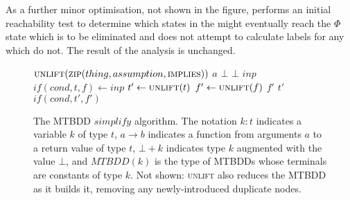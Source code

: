 As a further minor optimisation, not shown in the figure,
{\implementation} performs an initial reachability test to determine
which states in the {\StateMachine} might eventually reach the $\Phi$
state which is to be eliminated and does not attempt to calculate
labels for any which do not.  The result of the analysis is unchanged.

\begin{figure}
\begin{algorithmic}
  \State \Return $\textsc{unlift}(\textsc{zip}(thing, assumption, \textsc{implies}))$
\EndFunction
{}
    \State \Return $a$
  \Else
    \State \Return $\bot$
  \EndIf
\EndFunction
{}
    \State \Return $\bot$
    \State \Return $inp$
  \Else
    \State $if(cond, t, f) \gets inp$
    \State $t' \gets \textsc{unlift}(t)$
    \State $f' \gets \textsc{unlift}(f)$
      \State \Return $f'$
      \State \Return $t'$
    \Else
      \State \Return $if(cond, t', f')$
    \EndIf
  \EndIf
\EndFunction
\end{algorithmic}
\caption{The MTBDD $simplify$ algorithm.  The notation $k:t$ indicates
  a variable $k$ of type $t$, $a \rightarrow b$ indicates a function
  from arguments $a$ to a return value of type $t$, $\bot + k$
  indicates type $k$ augmented with the value $\bot$, and $MTBDD(k)$
  is the type of MTBDDs whose terminals are constants of type $k$.
  Not shown: \textsc{unlift} also reduces the MTBDD as it builds it,
  removing any newly-introduced duplicate nodes.}
\label{fig:derive:phi_elimination:simplify}
\end{figure}





